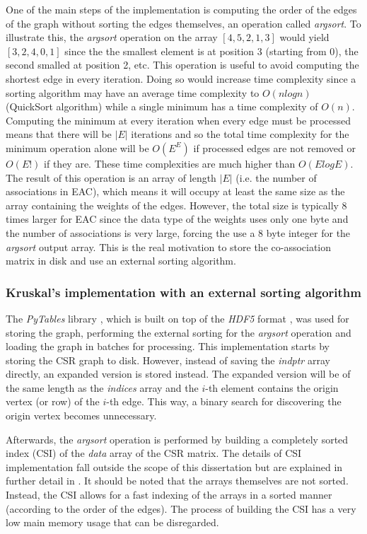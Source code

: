 One of the main steps of the implementation is computing the order of the edges of the graph without sorting the edges themselves, an operation called \emph{argsort}.
To illustrate this, the \emph{argsort} operation on the array $ \left [  4 , 5 , 2 , 1, 3 \right ]$ would yield $ \left [  3 , 2 , 4, 0 , 1 \right ]$ since the the smallest element is at position 3 (starting from 0), the second smalled at position 2, etc.
This operation is useful to avoid computing the shortest edge in every iteration.
Doing so would increase time complexity since a sorting algorithm may have an average time complexity to $O(n log n)$ (QuickSort algorithm) while a single minimum has a time complexity of $O(n)$.
Computing the minimum at every iteration when every edge must be processed means that there will be $|E|$ iterations and so the total time complexity for the minimum operation alone will be $O(E ^ E)$ if processed edges are not removed or $O(E!)$ if they are.
These time complexities are much higher than $O(E log E)$.
The result of this operation is an array of length $|E|$ (i.e. the number of associations in EAC), which means it will occupy at least the same size as the array containing the weights of the edges.
However, the total size is typically 8 times larger for EAC since the data type of the weights uses only one byte and the number of associations is very large, forcing the use a 8 byte integer for the \emph{argsort} output array.
This is the real motivation to store the co-association matrix in disk and use an external sorting algorithm.

\subsubsection{Kruskal's implementation with an external sorting algorithm}

The \emph{PyTables} library \cite{pytables}, which is built on top of the \emph{HDF5} format \cite{hdf5}, was used for storing the graph, performing the external sorting for the \emph{argsort} operation and loading the graph in batches for processing.
This implementation starts by storing the CSR graph to disk.
However, instead of saving the \emph{indptr} array directly, an expanded version is stored instead.
The expanded version will be of the same length as the \emph{indices} array and the $i$-th element contains the origin vertex (or row) of the $i$-th edge.
This way, a binary search for discovering the origin vertex becomes unnecessary.

Afterwards, the \emph{argsort} operation is performed by building a completely sorted index (CSI) of the \emph{data} array of the CSR matrix.
The details of CSI implementation fall outside the scope of this dissertation but are explained in further detail in \cite{AltetiAbad2007}.
It should be noted that the arrays themselves are not sorted.
Instead, the CSI allows for a fast indexing of the arrays in a sorted manner (according to the order of the edges).
The process of building the CSI has a very low main memory usage that can be disregarded.

